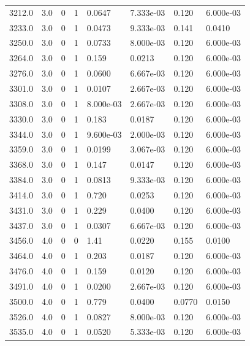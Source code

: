 \documentclass[preview]{standalone}
\begin{document}
{{{{{{{\begin{tabular}{L{1.2cm}C{1.2cm} C{0.3cm}C{0.5cm} C{1.4cm}C{1.4cm} C{1.4cm}C{1.4cm}}
  3212.0  &   3.0  & 0     &  1 &  0.0647  & 7.333e-03  & 0.120 &  6.000e-03   \\ 
  3233.0  &   3.0  & 0     &  1 &  0.0473  & 9.333e-03  & 0.141 &  0.0410   \\ 
  3250.0  &   3.0  & 0     &  1 &  0.0733  & 8.000e-03  & 0.120 &  6.000e-03   \\ 
  3264.0  &   3.0  & 0     &  1 &  0.159  & 0.0213  & 0.120 &  6.000e-03   \\ 
  3276.0  &   3.0  & 0     &  1 &  0.0600  & 6.667e-03  & 0.120 &  6.000e-03   \\ 
  3301.0  &   3.0  & 0     &  1 &  0.0107  & 2.667e-03  & 0.120 &  6.000e-03   \\ 
  3308.0  &   3.0  & 0     &  1 &  8.000e-03  & 2.667e-03  & 0.120 &  6.000e-03   \\ 
  3330.0  &   3.0  & 0     &  1 &  0.183  & 0.0187  & 0.120 &  6.000e-03   \\ 
  3344.0  &   3.0  & 0     &  1 &  9.600e-03  & 2.000e-03  & 0.120 &  6.000e-03   \\ 
  3359.0  &   3.0  & 0     &  1 &  0.0199  & 3.067e-03  & 0.120 &  6.000e-03   \\ 
  3368.0  &   3.0  & 0     &  1 &  0.147  & 0.0147  & 0.120 &  6.000e-03   \\ 
  3384.0  &   3.0  & 0     &  1 &  0.0813  & 9.333e-03  & 0.120 &  6.000e-03   \\ 
  3414.0  &   3.0  & 0     &  1 &  0.720  & 0.0253  & 0.120 &  6.000e-03   \\ 
  3431.0  &   3.0  & 0     &  1 &  0.229  & 0.0400  & 0.120 &  6.000e-03   \\ 
  3437.0  &   3.0  & 0     &  1 &  0.0307  & 6.667e-03  & 0.120 &  6.000e-03   \\ 
  3456.0  &   4.0  & 0     &  0 &  1.41  & 0.0220  & 0.155 &  0.0100   \\ 
  3464.0  &   4.0  & 0     &  1 &  0.203  & 0.0187  & 0.120 &  6.000e-03   \\ 
  3476.0  &   4.0  & 0     &  1 &  0.159  & 0.0120  & 0.120 &  6.000e-03   \\ 
  3491.0  &   4.0  & 0     &  1 &  0.0200  & 2.667e-03  & 0.120 &  6.000e-03   \\ 
  3500.0  &   4.0  & 0     &  1 &  0.779  & 0.0400  & 0.0770 &  0.0150   \\ 
  3526.0  &   4.0  & 0     &  1 &  0.0827  & 8.000e-03  & 0.120 &  6.000e-03   \\ 
  3535.0  &   4.0  & 0     &  1 &  0.0520  & 5.333e-03  & 0.120 &  6.000e-03   \\ 

\end{tabular}}}}}}}}
\end{document}

